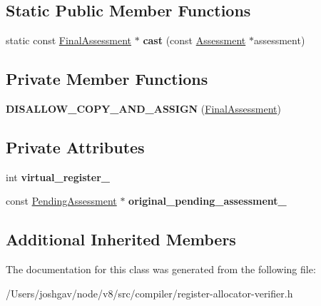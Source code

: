 \subsection*{Static Public Member Functions}
\begin{DoxyCompactItemize}
\item 
static const \hyperlink{classv8_1_1internal_1_1compiler_1_1_final_assessment}{Final\+Assessment} $\ast$ {\bfseries cast} (const \hyperlink{classv8_1_1internal_1_1compiler_1_1_assessment}{Assessment} $\ast$assessment)\hypertarget{classv8_1_1internal_1_1compiler_1_1_final_assessment_aac41b7699345d7941317b9e747329f4f}{}\label{classv8_1_1internal_1_1compiler_1_1_final_assessment_aac41b7699345d7941317b9e747329f4f}

\end{DoxyCompactItemize}
\subsection*{Private Member Functions}
\begin{DoxyCompactItemize}
\item 
{\bfseries D\+I\+S\+A\+L\+L\+O\+W\+\_\+\+C\+O\+P\+Y\+\_\+\+A\+N\+D\+\_\+\+A\+S\+S\+I\+GN} (\hyperlink{classv8_1_1internal_1_1compiler_1_1_final_assessment}{Final\+Assessment})\hypertarget{classv8_1_1internal_1_1compiler_1_1_final_assessment_aea8dbe98db7ff33096c4448058eadb86}{}\label{classv8_1_1internal_1_1compiler_1_1_final_assessment_aea8dbe98db7ff33096c4448058eadb86}

\end{DoxyCompactItemize}
\subsection*{Private Attributes}
\begin{DoxyCompactItemize}
\item 
int {\bfseries virtual\+\_\+register\+\_\+}\hypertarget{classv8_1_1internal_1_1compiler_1_1_final_assessment_a3885f2e94cd94c1ebfbc9611885bf6b5}{}\label{classv8_1_1internal_1_1compiler_1_1_final_assessment_a3885f2e94cd94c1ebfbc9611885bf6b5}

\item 
const \hyperlink{classv8_1_1internal_1_1compiler_1_1_pending_assessment}{Pending\+Assessment} $\ast$ {\bfseries original\+\_\+pending\+\_\+assessment\+\_\+}\hypertarget{classv8_1_1internal_1_1compiler_1_1_final_assessment_a5f1e5c228c4154f5f77ebaec8ff6bb67}{}\label{classv8_1_1internal_1_1compiler_1_1_final_assessment_a5f1e5c228c4154f5f77ebaec8ff6bb67}

\end{DoxyCompactItemize}
\subsection*{Additional Inherited Members}


The documentation for this class was generated from the following file\+:\begin{DoxyCompactItemize}
\item 
/\+Users/joshgav/node/v8/src/compiler/register-\/allocator-\/verifier.\+h\end{DoxyCompactItemize}
